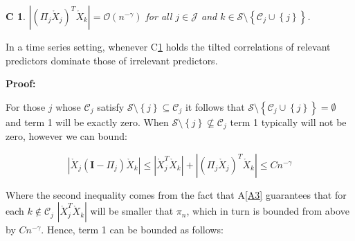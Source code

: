 \documentclass[11pt]{report}\usepackage[utf8]{inputenc}
\newtheorem{condition}{C}
\newtheorem{theorem}{Theorem}
\begin{document}
\begin{condition}\label{C1}
    $\left | \left ( \Pi_j \mathring{X}_j \right )^T \mathring{X}_k \right | = \mathcal{O}\left ( n^{-\gamma} \right )$ for all $j \in \mathcal{J}$ and $k \in \mathcal{S} \setminus \left \{ \mathcal{C}_j \cup \left \{ j \right \} \right \}$. 
\end{condition}

In a time series setting, whenever C\ref{C1} holds the tilted correlations of relevant predictors dominate those of irrelevant predictors.

\bigskip


\bigskip

\textbf{Proof:}

For those $j$ whose $\mathcal{C}_j$ satisfy $\mathcal{S} \setminus \left \{ j \right \} \subseteq \mathcal{C}_j$ it follows that $\mathcal{S} \setminus \left \{ \mathcal{C}_j \cup \left \{ j \right \}  \right \} = \emptyset$ and term 1 will be exactly zero. When $\mathcal{S} \setminus \left \{ j \right \} \nsubseteq \mathcal{C}_j$ term 1 typically will not be zero, however we can bound: 

\begin{equation*}
    \left | \mathring{X}_j \left ( \mathbf{I} - \Pi_j\right ) \mathring{X}_k \right | \leq \left | \mathring{X}_j^T \mathring{X}_k \right | + \left | \left ( \Pi_j \mathring{X}_j \right )^T \mathring{X}_k \right | \leq Cn^{-\gamma}
\end{equation*}

Where the second inequality comes from the fact that A\ref{A3} guarantees that for each $k \notin \mathcal{C}_j$ $\left | \mathring{X}_j^T \mathring{X}_k \right |$ will be smaller that $\pi_{n}$, which in turn is bounded from above by $Cn^{-\gamma}$. Hence, term 1 can be bounded as follows: 
\end{document}
